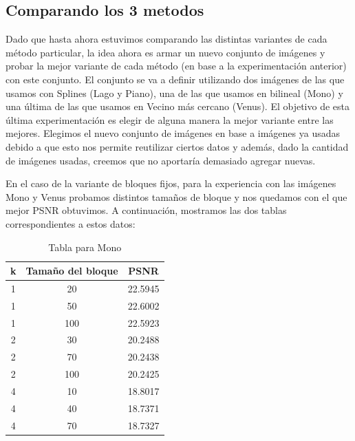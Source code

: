 \documentclass[a4paper]{article}
\begin{document}
\subsection{Comparando los 3 metodos}
Dado que hasta ahora estuvimos comparando las distintas variantes de cada método particular, la idea ahora es armar un nuevo conjunto de imágenes y probar la mejor variante de cada método (en base a la experimentación anterior) con este conjunto. El conjunto se va a definir utilizando dos imágenes de las que usamos con Splines (Lago y Piano), una de las que usamos en bilineal (Mono) y una última de las que usamos en Vecino más cercano (Venus). El objetivo de esta última experimentación es elegir de alguna manera la mejor variante entre las mejores. Elegimos el nuevo conjunto de imágenes en base a imágenes ya usadas debido a que esto nos permite reutilizar ciertos datos y además, dado la cantidad de imágenes usadas, creemos que no aportaría demasiado agregar nuevas.
\par En el caso de la variante de bloques fijos, para la experiencia con las imágenes Mono y Venus probamos distintos tamaños de bloque y nos quedamos con el que mejor PSNR obtuvimos. A continuación, mostramos las dos tablas correspondientes a estos datos:

\begin{table}[h]
\centering
\label{my-label}
\begin{tabular}{|c|c|c|}
\hline
k & Tamaño del bloque & PSNR    \\ \hline
1 & 20                & 22.5945 \\ \hline
1 & 50                & 22.6002 \\ \hline
1 & 100               & 22.5923 \\ \hline
2 & 30                & 20.2488 \\ \hline
2 & 70                & 20.2438 \\ \hline
2 & 100               & 20.2425 \\ \hline
4 & 10                & 18.8017 \\ \hline
4 & 40                & 18.7371 \\ \hline
4 & 70                & 18.7327 \\ \hline
\end{tabular}
\caption{Tabla para Mono}
\end{table}
\end{document}

